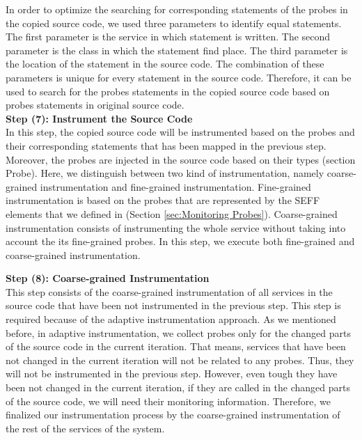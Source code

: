 In order to optimize the searching for corresponding statements of the probes in the copied source code, we used three parameters to identify equal statements. The first parameter is the service in which statement is written. The second parameter is the class in which the statement find place. The third parameter is the location of the statement in the source code. The combination of these parameters is unique for every statement in the source code. Therefore, it can be used to search for the probes statements in the copied source code based on probes statements in original source code. \\

\textbf{Step (7): Instrument the Source Code}\\
In this step, the copied source code will be instrumented based on the probes and their corresponding statements that has been mapped in the previous step. Moreover, the probes are injected in the source code based on their types (section Probe).  Here, we distinguish between two kind of instrumentation, namely coarse-grained instrumentation and fine-grained instrumentation. Fine-grained instrumentation is based on the probes that are represented by the SEFF elements that we defined in (Section \ref{sec:Monitoring Probes}). Coarse-grained instrumentation consists of instrumenting the whole service without taking into account the its fine-grained probes. In this step, we execute both fine-grained and coarse-grained instrumentation. 

\textbf{Step (8): Coarse-grained Instrumentation}\\
This step consists of the coarse-grained instrumentation of all services in the source code that have been not instrumented in the previous step.  This step is required because of the adaptive instrumentation approach. As we mentioned before, in adaptive instrumentation, we collect probes only for the changed parts of the source code in the current iteration. That means, services that have been not changed in the current iteration will not be related to any probes. Thus, they will not be instrumented in the previous step. However, even tough they have been not changed in the current iteration, if they are called in the changed parts of the source code, we will need their monitoring information. Therefore, we finalized our instrumentation process by the coarse-grained instrumentation of the rest of the services of the system.  

